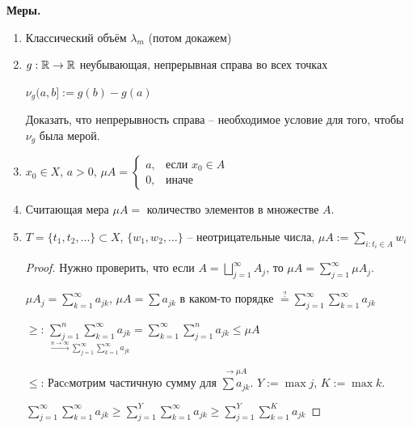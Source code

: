 \begin{example}
    \textbf{Меры.}
    \begin{enumerate}
        \item Классический объём $\lambda_m$ (потом докажем)
        \item $g: \mathbb{R} \rightarrow \mathbb{R}$ неубывающая, непрерывная справа во всех точках
        
        $\nu_g(a, b]:=g(b) - g(a)$

        \begin{exercise}
            Доказать, что непрерывность справа – необходимое условие для того,
            чтобы $\nu_g$ была мерой.
        \end{exercise}

        \item $x_0\in X$, $a>0$, $\mu A=\left\{\begin{array}{ll}
            a, & \text{если } x_0\in A \\
            0, & \text{иначе}
        \end{array}\right.$
        \item Считающая мера $\mu A=$ количество элементов в множестве $A$.
        \item $T=\{t_1, t_2, ...\}\subset X$, $\{w_1, w_2, ...\}$ –  неотрицательные числа, $\mu A:=\sum\limits_{i:t_i\in A}w_i$

        \begin{proof}
            Нужно проверить, что если $A=\bigsqcup\limits_{j=1}^\infty A_j$, то $\mu A = \sum \limits_{j=1}^\infty\mu  A_j$. 
            
            $\mu  A_j=\sum \limits_{k=1}^\infty a_{jk}$, $\mu A = \sum a_{jk}$ в каком-то порядке $\underset{}{\overset{?}{=}}\sum \limits_{j=1}^\infty \sum \limits_{k=1}^\infty a_{jk}$

            $\geq$: $\underset{\overset{n\rightarrow \infty}{\rightarrow} \sum \limits_{j=1}^\infty\sum \limits_{k=1}^\infty a_{jk}}{\sum \limits_{j=1}^n\sum \limits_{k=1}^\infty a_{jk}}=\sum \limits_{k=1}^\infty\sum \limits_{j=1}^n a_{jk} \leq \mu A$

            $\leq$: Расcмотрим частичную сумму для $\overset{\rightarrow \mu A}{\sum a_{jk}}$. $Y := \max j$, $K := \max k$.

            $\sum \limits_{j=1}^\infty\sum \limits_{k=1}^\infty a_{jk}\geq \sum \limits_{j=1}^Y\sum \limits_{k=1}^\infty a_{jk}\geq \sum \limits_{j=1}^Y\sum \limits_{k=1}^K a_{jk}$

        \end{proof}
    \end{enumerate}
\end{example}

